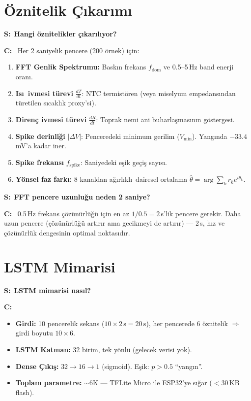 \documentclass[11pt,a4paper]{article}
\newcommand{\soru}[1]{\vskip12pt\noindent\textcolor{ember}{\textbf{S:}}~\textbf{#1}\par\vskip4pt\noindent\textcolor{myco}{\textbf{C:}}~}
\begin{document}
\section{\"Oznitelik \c{C}\i kar\i m\i}

\soru{Hangi \"oznitelikler \c{c}\i kar\i l\i yor?}
Her 2 saniyelik pencere (200 \"ornek) i\c{c}in:
\begin{enumerate}
  \item \textbf{FFT Genlik Spektrumu:} Bask\i n frekans $f_{\mathrm{dom}}$ ve 0.5--5\,Hz band enerji oran\i .
  \item \textbf{Is\i\ ivmesi t\"urevi} $\frac{dT}{dt}$: NTC termist\"oren (veya miselyum empedans\i ndan t\"uretilen s\i cakl\i k proxy'si).
  \item \textbf{Diren\c{c} ivmesi t\"urevi} $\frac{dR}{dt}$: Toprak nemi ani buharla\c{s}mas\i n\i n g\"ostergesi.
  \item \textbf{Spike derinli\u{g}i} $|\Delta V|$: Penceredeki minimum gerilim ($V_{\min}$). Yang\i nda $-33.4$\,mV'a kadar iner.
  \item \textbf{Spike frekans\i} $f_{\mathrm{spike}}$: Saniyedeki e\c{s}ik ge\c{c}i\c{s} say\i s\i .
  \item \textbf{Y\"onsel faz fark\i:} 8 kanaldan a\u{g}\i rl\i kl\i\ dairesel ortalama $\hat\theta = \arg\!\sum_k r_k e^{i\theta_k}$.
\end{enumerate}

\soru{FFT pencere uzunlu\u{g}u neden 2 saniye?}
0.5\,Hz frekans \c{c}\"oz\"un\"url\"u\u{g}\"u i\c{c}in en az $1/0.5 = 2$\,s'lik pencere gerekir. Daha uzun pencere (\c{c}\"oz\"un\"url\"u\u{g}\"u art\i r\i r ama gecikmeyi de art\i r\i r) --- 2\,s, h\i z ve \c{c}\"oz\"un\"url\"uk dengesinin optimal noktas\i d\i r.

\section{LSTM Mimarisi}

\soru{LSTM mimarisi nas\i l?}
\begin{itemize}[leftmargin=1.2cm]
  \item \textbf{Girdi:} 10 pencerelik sekans ($10 \times 2\,\mathrm{s} = 20\,\mathrm{s}$), her pencerede 6 \"oznitelik $\Rightarrow$ girdi boyutu $10 \times 6$.
  \item \textbf{LSTM Katman:} 32 birim, tek y\"onl\"u (gelecek verisi yok).
  \item \textbf{Dense \c{C}\i k\i\c{s}:} $32 \to 16 \to 1$ (sigmoid). E\c{s}ik: $p > 0.5$ ``yang\i n''.
  \item \textbf{Toplam parametre:} $\sim$6K --- TFLite Micro ile ESP32'ye s\i\u{g}ar ($<$30\,KB flash).
\end{itemize}
\end{document}
